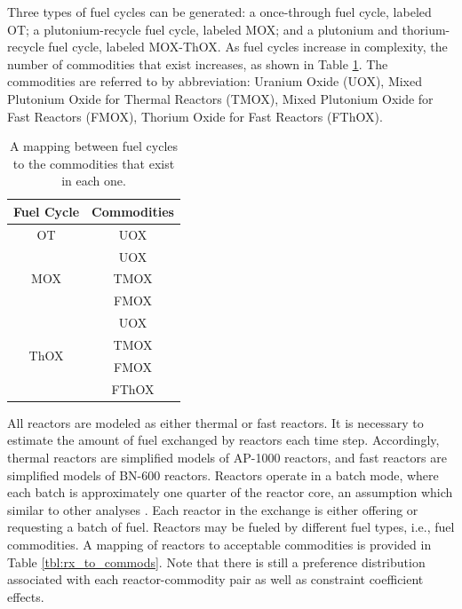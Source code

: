 \documentclass{anstrans}
\begin{document}
Three types of fuel cycles can be generated: a once-through fuel cycle, labeled
OT; a plutonium-recycle fuel cycle, labeled MOX; and a plutonium and
thorium-recycle fuel cycle, labeled MOX-ThOX. As fuel cycles increase in
complexity, the number of commodities that exist increases, as shown in Table
\ref{tbl:fc_to_commods}. The commodities are referred to by abbreviation:
Uranium Oxide (UOX), Mixed Plutonium Oxide for Thermal Reactors (TMOX), Mixed
Plutonium Oxide for Fast Reactors (FMOX), Thorium Oxide for Fast Reactors
(FThOX).

\begin{table}[]
\centering
\caption{A mapping between fuel cycles to the commodities that exist in each one.}
\label{tbl:fc_to_commods}
\begin{tabular}{|c|c|}
\hline
\textbf{Fuel Cycle}            & \textbf{Commodities} \\ \hline
OT                    & UOX         \\ \hline
\multirow{3}{*}{MOX}  & UOX         \\  
                      & TMOX        \\  
                      & FMOX        \\ \hline
\multirow{4}{*}{ThOX} & UOX         \\  
                      & TMOX        \\  
                      & FMOX        \\  
                      & FThOX       \\ \hline
\end{tabular}
\end{table}

All reactors are modeled as either thermal or fast reactors. It is necessary to
estimate the amount of fuel exchanged by reactors each time step. Accordingly,
thermal reactors are simplified models of AP-1000 reactors, and fast reactors
are simplified models of BN-600 reactors. Reactors operate in a batch mode,
where each batch is approximately one quarter of the reactor core, an assumption
which similar to other analyses \cite{rineiski2011reactivity}. Each reactor in
the exchange is either offering or requesting a batch of fuel. Reactors may be
fueled by different fuel types, i.e., fuel commodities. A mapping of reactors to
acceptable commodities is provided in Table \ref{tbl:rx_to_commods}. Note that
there is still a preference distribution associated with each reactor-commodity
pair as well as constraint coefficient effects.
\end{document}
